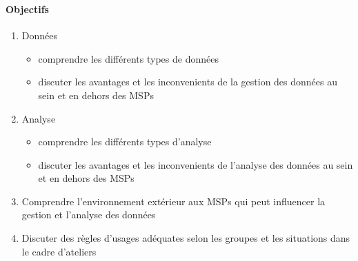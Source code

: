 \begin{frame}
\frametitle{\formationFb}
\framesubtitle{Objectifs}

\begin{enumerate}
\item Données
\begin{itemize}
\item comprendre les différents types de données
\item discuter les avantages et les inconvenients de la gestion des données au sein et en dehors des MSPs
\end{itemize}

\item Analyse
\begin{itemize}
\item comprendre les différents types d'analyse
\item discuter les avantages et les inconvenients de l'analyse des données au sein et en dehors des MSPs
\end{itemize}

\item Comprendre l'environnement extérieur aux MSPs qui peut influencer la gestion et l'analyse des données

\item Discuter des règles d'usages adéquates selon les groupes et les situations dans le cadre d'ateliers

\end{enumerate}


\end{frame}

